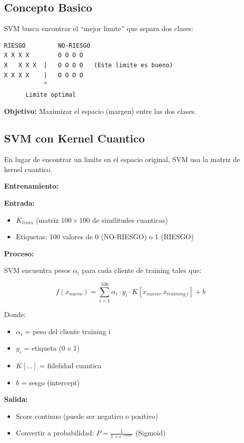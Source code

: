 \documentclass[11pt]{article}
\begin{document}
\subsection*{Concepto Basico}

SVM busca encontrar el ``mejor limite'' que separa dos clases:

\begin{verbatim}
RIESGO         NO-RIESGO
X X X X        O O O O
X   X X X  |   O O O O   (Este limite es bueno)
X X X X    |   O O O O
           ^
      Limite optimal
\end{verbatim}

\textbf{Objetivo:} Maximizar el espacio (margen) entre las dos clases.

\subsection*{SVM con Kernel Cuantico}

En lugar de encontrar un limite en el espacio original, SVM usa la matriz de kernel cuantico.

\textbf{Entrenamiento:}

\textbf{Entrada:}
\begin{itemize}
\item $K_{train}$ (matriz $100 \times 100$ de similitudes cuanticas)
\item Etiquetas: 100 valores de 0 (NO-RIESGO) o 1 (RIESGO)
\end{itemize}

\textbf{Proceso:}

SVM encuentra pesos $\alpha_i$ para cada cliente de training tales que:

$$f(x_{nuevo}) = \sum_{i=1}^{100} \alpha_i \cdot y_i \cdot K[x_{nuevo}, x_{training\_i}] + b$$

Donde:
\begin{itemize}
\item $\alpha_i$ = peso del cliente training i
\item $y_i$ = etiqueta (0 o 1)
\item $K[...]$ = fidelidad cuantica
\item $b$ = sesgo (intercept)
\end{itemize}

\textbf{Salida:}
\begin{itemize}
\item Score continuo (puede ser negativo o positivo)
\item Convertir a probabilidad: $P = \frac{1}{1 + e^{-score}}$ (Sigmoid)
\end{itemize}
\end{document}
